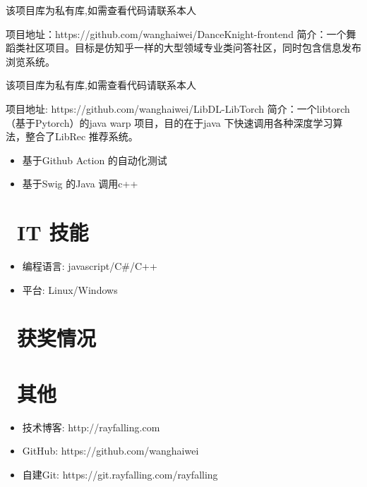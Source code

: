 \documentclass{resume}
\begin{document}
该项目库为私有库,如需查看代码请联系本人
\begin{onehalfspacing}
项目地址：https://github.com/wanghaiwei/DanceKnight-frontend
\newline
简介：一个舞蹈类社区项目。目标是仿知乎一样的大型领域专业类问答社区，同时包含信息发布浏览系统。
\end{onehalfspacing}

该项目库为私有库,如需查看代码请联系本人
\begin{onehalfspacing}
项目地址: https://github.com/wanghaiwei/LibDL-LibTorch
\newline
简介：一个libtorch（基于Pytorch）的java warp 项目，目的在于java 下快速调用各种深度学习算法，整合了LibRec 推荐系统。
\begin{itemize}
  \item 基于Github Action 的自动化测试
  \item 基于Swig 的Java 调用c++
\end{itemize}
\end{onehalfspacing}

\section{\faCogs\ IT 技能}
\begin{itemize}[parsep=0.5ex]
  \item 编程语言: javascript/C\#/C++
  \item 平台: Linux/Windows
\end{itemize}

\section{\faHeartO\ 获奖情况}

\section{\faInfo\ 其他}
\begin{itemize}[parsep=0.5ex]
  \item 技术博客: http://rayfalling.com
  \item GitHub: https://github.com/wanghaiwei
  \item 自建Git: https://git.rayfalling.com/rayfalling
\end{itemize}

%
%
\end{document}

